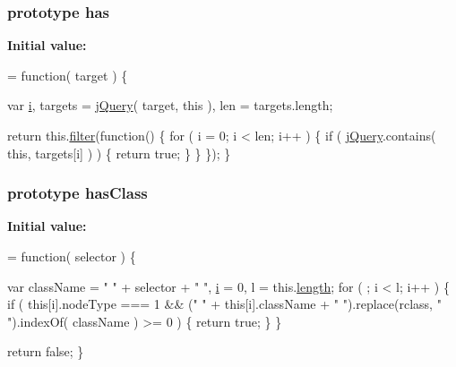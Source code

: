 \subsubsection[{has}]{ {\bf prototype} has}\label{jquery-1_810_82-vsdoc_8js_a3976525435f2cc0ddbdfd1fd4fa719ec}
{\bfseries Initial value\+:}
\begin{DoxyCode}
= \textcolor{keyword}{function}( target ) \{


        var \hyperlink{_bibabook_2_scripts_2respond_8min_8js_a5e25b1d1bed9ab5f3174b76d6a722180}{i},
            targets = \hyperlink{jquery-1_810_82-vsdoc_8js_add5237586d970a38a81f990e8eb28c6c}{jQuery}( target, \textcolor{keyword}{this} ),
            len = targets.length;

        \textcolor{keywordflow}{return} this.\hyperlink{jquery-1_810_82-vsdoc_8js_ac99d0cf56cab46114f5765a14e03ad6d}{filter}(\textcolor{keyword}{function}() \{
            \textcolor{keywordflow}{for} ( i = 0; i < len; i++ ) \{
                \textcolor{keywordflow}{if} ( \hyperlink{jquery-1_810_82-vsdoc_8js_add5237586d970a38a81f990e8eb28c6c}{jQuery}.contains( \textcolor{keyword}{this}, targets[i] ) ) \{
                    \textcolor{keywordflow}{return} \textcolor{keyword}{true};
                \}
            \}
        \});
    \}
\end{DoxyCode}
\hypertarget{jquery-1_810_82-vsdoc_8js_a8a4b3bae3851e6836fad6374ebac2bfe}{}
\subsubsection[{has\+Class}]{ {\bf prototype} has\+Class}\label{jquery-1_810_82-vsdoc_8js_a8a4b3bae3851e6836fad6374ebac2bfe}
{\bfseries Initial value\+:}
\begin{DoxyCode}
= \textcolor{keyword}{function}( selector ) \{


        var className = \textcolor{stringliteral}{" "} + selector + \textcolor{stringliteral}{" "},
            \hyperlink{_bibabook_2_scripts_2respond_8min_8js_a5e25b1d1bed9ab5f3174b76d6a722180}{i} = 0,
            l = this.\hyperlink{jquery-1_810_82-vsdoc_8js_aa7de35d58da66d9944ab9cbe82c19640}{length};
        \textcolor{keywordflow}{for} ( ; i < l; i++ ) \{
            \textcolor{keywordflow}{if} ( \textcolor{keyword}{this}[i].nodeType === 1 && (\textcolor{stringliteral}{" "} + \textcolor{keyword}{this}[i].className + \textcolor{stringliteral}{" "}).replace(rclass, \textcolor{stringliteral}{" "}).indexOf( 
      className ) >= 0 ) \{
                \textcolor{keywordflow}{return} \textcolor{keyword}{true};
            \}
        \}

        \textcolor{keywordflow}{return} \textcolor{keyword}{false};
    \}
\end{DoxyCode}
\hypertarget{jquery-1_810_82-vsdoc_8js_ae295a27c2f07b73f73ec6e43b4a0eb88}{}
